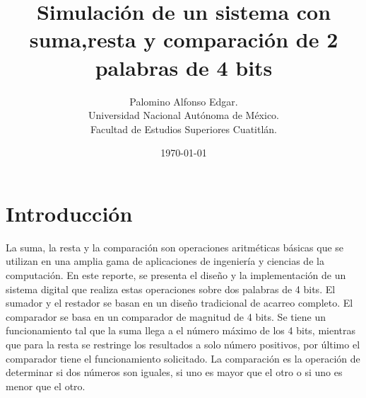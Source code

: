 \documentclass[a4paper, 12pt]{article}
\title{Simulación de un sistema con suma,resta y comparación de 2 palabras de 4 bits}
\author{Palomino Alfonso Edgar.\\Universidad Nacional Autónoma de México.\\Facultad de Estudios Superiores Cuatitlán.}
\date{\today}
\begin{document}
    \maketitle  
    \vspace{2ex}

    \section{Introducción}
    La suma, la resta y la comparación son operaciones aritméticas básicas que se utilizan en una amplia gama de aplicaciones de ingeniería y ciencias de la computación. En este reporte, se presenta el diseño y la implementación de un sistema digital que realiza estas operaciones sobre dos palabras de 4 bits.
    El sumador y el restador se basan en un diseño tradicional de acarreo completo. El comparador se basa en un comparador de magnitud de 4 bits.
    Se tiene un funcionamiento tal que la suma llega a el número máximo de los 4 bits, mientras que para la resta se restringe los resultados a solo número positivos, por último el comparador tiene el funcionamiento solicitado. La comparación es la operación de determinar si dos números son iguales, si uno es mayor que el otro o si uno es menor que el otro.
    
\end{document}
